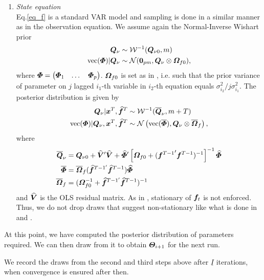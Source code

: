 \begin{enumerate}
\begin{enumerate}
\item
\textit{State equation}\\
Eq.\eqref{eq_f} is a standard VAR model and sampling is done in a similar manner as in the observation equation. We assume again the Normal-Inverse Wishart prior
\begin{align}
	\bm Q_\nu&\sim\mathcal{W}^{-1}(\bm Q_{\nu0},m)\\
	\operatorname{vec}(\bm \varPhi)|\bm Q_\nu&\sim\mathcal{N}(\boldsymbol{0}_{pm},\bm Q_\nu\otimes\bm \varOmega_{f0}),
\end{align}
where
$\bm \varPhi=
	\begin{pmatrix}
		\bm \varPhi_1&\dots&\bm \varPhi_p
	\end{pmatrix}$.
$\bm \varOmega_{f0}$ is set as in \cite{FAVAR}, i.e. such that the prior variance of parameter on $j$ lagged $i_1$-th variable in $i_2$-th equation equals $\sigma_{i_2}^2/j\sigma_{i_1}^2$. The posterior distribution is given by
\begin{align}
	\bm Q_\nu|\bm x^T,\widehat{\bm f}^T&\sim\mathcal{W}^{-1}(\overline{\bm Q}_\nu,m+T)\\
	\operatorname{vec}(\bm \varPhi)|\bm Q_\nu,\bm x^T,\widehat{\bm f}^T&\sim\mathcal{N}\left(\operatorname{vec}(\overline{\bm \varPhi}),\bm Q_\nu\otimes\overline{\bm \varOmega}_f\right),
\end{align}
where
\begin{align}
	\overline{\bm Q}_\nu&=\bm Q_{\nu0}+\widehat{\bm V}'\widehat{\bm V}+\widehat{\bm \varPhi}'\left[\bm \varOmega_{f0}+({\bm f^{T-1}}'\bm f^{T-1})^{-1}\right]^{-1}\widehat{\bm \varPhi}\\
	\overline{\bm \varPhi}&=\overline{\bm \varOmega}_f(\widehat{\bm f}^{T-1'}\widehat{\bm f}^{T-1})\widehat{\bm \varPhi}\\
	\overline{\bm \varOmega}_f&=(\bm \varOmega_{f0}^{-1}+\widehat{\bm f}^{T-1'}\widehat{\bm f}^{T-1})^{-1}
\end{align}
and $\widehat{\bm V}$ is the OLS residual matrix. As in \cite{CCE15}, stationary of $\bm f_t$ is not enforced. Thus, we do not drop draws that suggest non-stationary like what is done in \cite{FAVAR} and \cite{FAVAR_sign}.
\end{enumerate}
At this point, we have computed the posterior distribution of parameters required. We can then draw from it to obtain $\bm \varTheta_{i+1}$ for the next run.
\end{enumerate}
We record the draws from the second and third steps above after $\underline I$ iterations, when convergence is ensured after then.